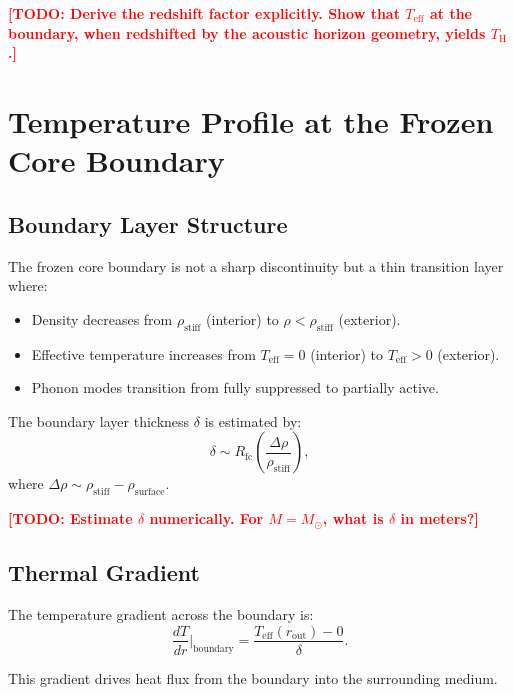 \documentclass[11pt,a4paper]{article}
\newcommand{\rhostiff}{\ensuremath{\rho_{\mathrm{stiff}}}}
\newcommand{\Teff}{\ensuremath{T_{\mathrm{eff}}}}
\newcommand{\Rfc}{\ensuremath{R_{\mathrm{fc}}}}
\newcommand{\TH}{\ensuremath{T_{\mathrm{H}}}}
\newcommand{\TODO}[1]{\textcolor{red}{\textbf{[TODO: #1]}}}
\theoremstyle{definition}
\theoremstyle{remark}
\begin{document}
\TODO{Derive the redshift factor explicitly. Show that $\Teff$ at the boundary, when redshifted by the acoustic horizon geometry, yields $\TH$.}

\section{Temperature Profile at the Frozen Core Boundary}
\label{sec:boundary}

\subsection{Boundary Layer Structure}
\label{sec:boundary_structure}

The frozen core boundary is not a sharp discontinuity but a thin transition layer where:
\begin{itemize}[leftmargin=*, itemsep=0.3em]
\item Density decreases from $\rhostiff$ (interior) to $\rho < \rhostiff$ (exterior).
\item Effective temperature increases from $\Teff = 0$ (interior) to $\Teff > 0$ (exterior).
\item Phonon modes transition from fully suppressed to partially active.
\end{itemize}

The boundary layer thickness $\delta$ is estimated by:
\begin{equation}
\delta \sim \Rfc \left( \frac{\Delta \rho}{\rhostiff} \right),
\end{equation}
where $\Delta \rho \sim \rhostiff - \rho_{\mathrm{surface}}$.

\TODO{Estimate $\delta$ numerically. For $M = M_\odot$, what is $\delta$ in meters?}

\subsection{Thermal Gradient}
\label{sec:thermal_gradient}

The temperature gradient across the boundary is:
\begin{equation}
\frac{dT}{dr} \bigg|_{\mathrm{boundary}} = \frac{\Teff(r_{\mathrm{out}}) - 0}{\delta}.
\end{equation}

This gradient drives heat flux from the boundary into the surrounding medium.
\end{document}
